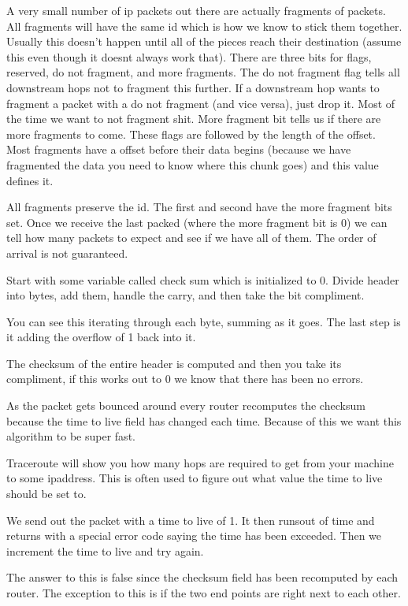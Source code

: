 \documentclass[12pt]{article}
\begin{document}

A very small number of ip packets out there are actually fragments of packets. All fragments will have the same id which is how we know to stick them together. Usually this doesn't happen until all of the pieces reach their destination (assume this even though it doesnt always work that). There are three bits for flags, reserved, do not fragment, and more fragments. The do not fragment flag tells all downstream hops not to fragment this further. If a downstream hop wants to fragment a packet with a do not fragment (and vice versa), just drop it. Most of the time we want to not fragment shit. More fragment bit tells us if there are more fragments to come. These flags are followed by the length of the offset. Most fragments have a offset before their data begins (because we have fragmented the data you need to know where this chunk goes) and this value defines it. 


All fragments preserve the id. The first and second have the more fragment bits set. Once we receive the last packed (where the more fragment bit is 0) we can tell how many packets to expect and see if we have all of them. The order of arrival is not guaranteed.



Start with some variable called check sum which is initialized to 0. Divide header into bytes, add them, handle the carry, and then take the bit compliment.


You can see this iterating through each byte, summing as it goes. The last step is it adding the overflow of 1 back into it.


The checksum of the entire header is computed and then you take its compliment, if this works out to 0 we know that there has been no errors. 


As the packet gets bounced around every router recomputes the checksum because the time to live field has changed each time. Because of this we want this algorithm to be super fast. 


Traceroute will show you how many hops are required to get from your machine to some ipaddress. This is often used to figure out what value the time to live should be set to.


We send out the packet with a time to live of 1. It then runsout of time and returns with a special error code saying the time has been exceeded. Then we increment the time to live and try again.


The answer to this is false since the checksum field has been recomputed by each router. The exception to this is if the two end points are right next to each other.
\end{document}
